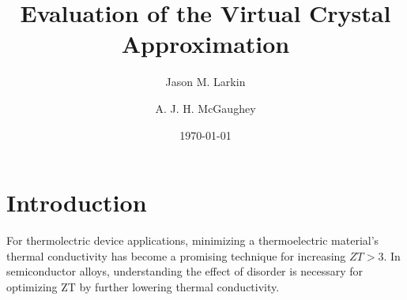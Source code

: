\documentclass[aps,prb,preprint,superscriptaddress,amsmath,amssymb,floatfix]{revtex4}
\begin{document}

\title{Evaluation of the Virtual Crystal Approximation}
\author{Jason M. Larkin}
\author{A. J. H. McGaughey}

\date{\today}


\begin{abstract}

\end{abstract}


\maketitle
\clearpage
\section{\label{S:Intro}Introduction}

For thermolectric device applications, minimizing a thermoelectric 
material's thermal 
conductivity has become a promising technique for increasing $ZT>3$.
\cite{chen_recent_2003,dresselhaus_new_2007} In semiconductor alloys, 
understanding the effect of disorder is necessary for optimizing 
ZT by further lowering thermal conductivity.
\cite{he_thermoelectric_2006,huang_filler-reduced_2010,
toberer_phonon_2011,tian_phonon_2012}
\end{document}
